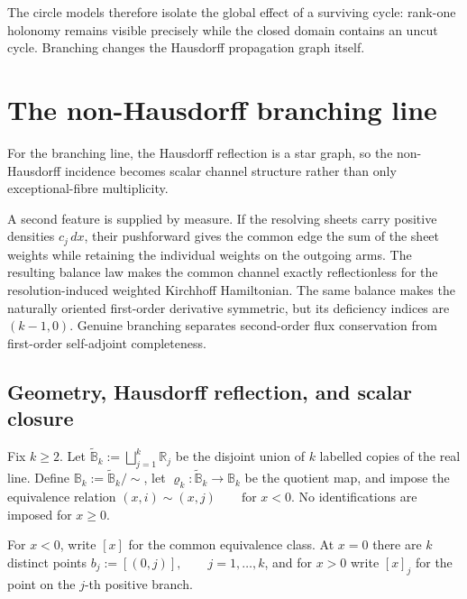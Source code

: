 \documentclass[11pt]{article}
\theoremstyle{plain}
\theoremstyle{definition}
\begin{document}
The circle models therefore isolate the global effect of a surviving cycle:
rank-one holonomy remains visible precisely while the closed domain contains
an uncut cycle. Branching changes the Hausdorff propagation graph itself.

\section{The non-Hausdorff branching line}
\label{sec:Bk}

For the branching line, the Hausdorff reflection is a star graph, so the non-Hausdorff incidence becomes scalar channel structure rather than only exceptional-fibre multiplicity.

A second feature is supplied by measure. If the resolving sheets carry
positive densities \(c_j\,dx\), their pushforward gives the common edge the
sum of the sheet weights while retaining the individual weights on the
outgoing arms. The resulting balance law makes the common channel exactly
reflectionless for the resolution-induced weighted Kirchhoff Hamiltonian. The same
balance makes the naturally oriented first-order derivative symmetric, but
its deficiency indices are
\((k-1,0)\).
Genuine branching separates second-order flux conservation from
first-order self-adjoint completeness.

\subsection{Geometry, Hausdorff reflection, and scalar closure}
\label{subsec:Bk-definition}
\label{subsec:Bk-reflection}
\label{subsec:Bk-smooth-scalars}
\label{subsec:Bk-versus-Lk}

Fix
\(k\geq2\).
Let \(\widetilde{\mathbb B}_k := \bigsqcup_{j=1}^{k}\mathbb R_j\) be the disjoint union of \(k\) labelled copies of the real line. Define
\(\mathbb B_k := \widetilde{\mathbb B}_k/\!\sim\),
let \(\varrho_k:\widetilde{\mathbb B}_k\longrightarrow\mathbb B_k\) be the quotient map, and impose the equivalence relation
\((x,i)\sim(x,j) \qquad \text{for }x<0\).
No identifications are imposed for \(x\geq0\).

For \(x<0\), write \([x]\) for the common equivalence class. At \(x=0\)
there are \(k\) distinct points
\(b_j:=[(0,j)], \qquad j=1,\ldots,k\),
and for \(x>0\) write \([x]_j\) for the point on the \(j\)-th positive branch.
\end{document}
